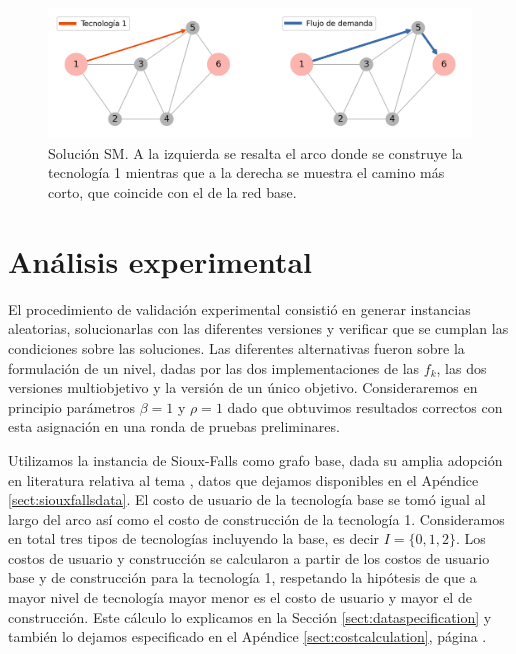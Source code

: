 \begin{figure}[h!]
  \centering
  \includegraphics[width=\linewidth]{../resources/example_2_sol_v1.png}
  \caption{Solución SM. A la izquierda se resalta el arco donde se construye la tecnología 1 mientras que a la derecha se muestra el camino más corto, que coincide con el de la red base.}
  \label{fig:example2solv1}
\end{figure}

\FloatBarrier
\section{Análisis experimental}

El procedimiento de validación experimental consistió en generar instancias aleatorias, solucionarlas con las diferentes versiones y verificar que se cumplan las condiciones sobre las soluciones. Las diferentes alternativas fueron sobre la formulación de un nivel, dadas por las dos implementaciones de las $f_k$, las dos versiones multiobjetivo y la versión de un único objetivo. Consideraremos en principio parámetros $\beta = 1$ y $\rho = 1$ dado que obtuvimos resultados correctos con esta asignación en una ronda de pruebas preliminares.

Utilizamos la instancia de Sioux-Falls como grafo base, dada su amplia adopción en literatura relativa al tema \parencite{Liu2019}, datos que dejamos disponibles en el Apéndice \ref{sect:siouxfallsdata}. El costo de usuario de la tecnología base se tomó igual al largo del arco así como el costo de construcción de la tecnología 1. Consideramos en total tres tipos de tecnologías incluyendo la base, es decir $I = \{0, 1, 2\}$. Los costos de usuario y construcción se calcularon a partir de los costos de usuario base y de construcción para la tecnología 1, respetando la hipótesis de que a mayor nivel de tecnología mayor menor es el costo de usuario y mayor el de construcción. Este cálculo lo explicamos en la Sección \ref{sect:dataspecification} y también lo dejamos especificado en el Apéndice \ref{sect:costcalculation}, página \pageref{sect:costcalculation}.

